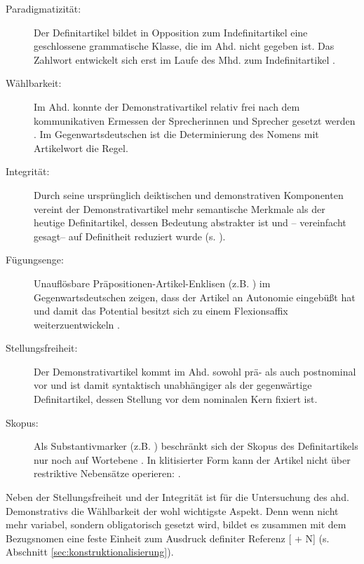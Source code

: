 \begin{description}
\item[Paradigmatizität:] Der Definitartikel bildet in Opposition zum Indefinitartikel eine geschlossene grammatische Klasse, die im Ahd. nicht gegeben ist. Das Zahlwort  entwickelt sich erst im Laufe des Mhd. zum Indefinitartikel \parencite{Szczepaniak2016a}. 
\item[Wählbarkeit:] Im Ahd. konnte der Demonstrativartikel relativ frei nach dem kommunikativen Ermessen der Sprecherinnen und Sprecher gesetzt werden \parencite{Oubouzar1992}. Im Gegenwartsdeutschen ist die Determinierung des Nomens mit Artikelwort die Regel. 
\item[Integrität:] Durch seine ursprünglich deiktischen und demonstrativen Komponenten vereint der Demonstrativartikel mehr semantische Merkmale als der heutige Definitartikel, dessen Bedeutung abstrakter ist und -- vereinfacht gesagt-- auf Definitheit reduziert wurde (s. \cite{Lehmann2015}).
\item[Fügungsenge:] Unauflösbare Präpositionen-Artikel-Enklisen (z.B. ) im Gegenwartsdeutschen zeigen, dass der Artikel an Autonomie eingebüßt hat und damit das Potential besitzt sich zu einem Flexionsaffix weiterzuentwickeln \parencite[s. hierzu][]{Nubling1992,Nubling2005}.  
\item[Stellungsfreiheit:] Der Demonstrativartikel kommt im Ahd. sowohl prä- als auch postnominal vor \parencite{Schrodt2004} und ist damit syntaktisch unabhängiger als der gegenwärtige Definitartikel, dessen Stellung vor dem nominalen Kern fixiert ist. 
\item[Skopus:] Als Substantivmarker (z.B. ) beschränkt sich der Skopus des Definitartikels nur noch auf Wortebene \parencite{Szczepaniak2011a}. In klitisierter Form kann der Artikel nicht über restriktive Nebensätze operieren:  \parencite[vgl.][112]{Nubling2005}.
\end{description}

\noindent
Neben der Stellungsfreiheit und der Integrität ist für die Untersuchung des ahd. Demonstrativs die Wählbarkeit der wohl wichtigste Aspekt. Denn wenn  nicht mehr variabel, sondern obligatorisch gesetzt wird, bildet es zusammen mit dem Bezugsnomen eine feste Einheit zum Ausdruck definiter Referenz [ + N] (s. Abschnitt \ref{sec:konstruktionalisierung}).   

